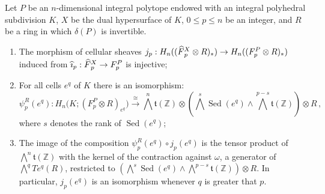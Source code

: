 \documentclass[AHL,Unicode,longabstracts,published]{cedram}
\newcommand{\Z}{\mathbb{Z}}
\renewcommand{\t}{\mathfrak{t}}
\DeclareMathOperator{\Sed}{Sed}
\newcommand{\Fbar}{\hat{F}}
\newcommand{\ibar}{\hat{\imath}}
\let\oldhat\hat
\renewcommand*{\hat}[1]{\mathchoice{\widehat{#1}}{\widehat{#1}}{\oldhat{#1}}{\oldhat{#1}}}
\begin{document}
\begin{lemm}\label{lemm:comparison_Hn(FX)_Hn(FP)}
Let $P$ be an $n$-dimensional integral polytope endowed with an integral polyhedral subdivision $K$, $X$ be the dual hypersurface of $K$, $0\leq p\leq n$ be an integer, and $R$ be a ring in which $\delta(P)$ is invertible.
\begin{enumerate}
\item The morphism of cellular sheaves ${j_p:H_n((\Fbar_p^X\otimes R)_*)\rightarrow H_n((F_p^P\otimes R)_*)}$ induced from ${\ibar_p:\Fbar_p^X\rightarrow F_p^P}$ is injective;
\item For all cells $e^q$ of $K$ there is an isomorphism:
\begin{equation*}
\psi_p^R(e^q):H_n\big(K;\left(F_p^P\otimes R\right)_{e^q}\big) \overset{\cong}{\longrightarrow} \bigwedge^n\t(\Z)\otimes\left(\bigwedge^s\Sed(e^q)\wedge\bigwedge^{p-s}\t(\Z)\right)\otimes R\,,
\end{equation*}
where $s$ denotes the rank of $\Sed(e^q)$;
\item The image of the composition $\psi_p^R(e^q)\circ j_p(e^q)$ is the tensor product of $\bigwedge^n\t(\Z)$ with the kernel of the contraction against $\omega$, a generator of $\bigwedge^qTe^q(R)$, restricted to $(\bigwedge^s\Sed(e^q)\wedge\bigwedge^{p-s}\t(\Z))\otimes R$. In particular, $j_p(e^q)$ is an isomorphism whenever $q$ is greater that $p$.
\end{enumerate}
\end{lemm}
\end{document}
